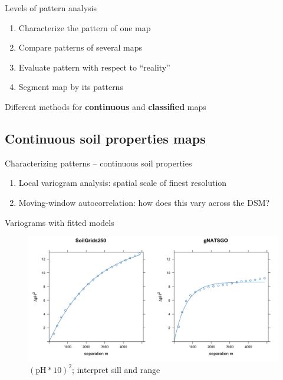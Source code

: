 \documentclass[aspectratio=169]{beamer}
\begin{document}
\begin{frame}{Levels of pattern analysis}
\begin{enumerate}
    \item Characterize the pattern of one map
    \item Compare patterns of several maps
    \item Evaluate pattern with respect to ``reality''
    \item Segment map by its patterns
\end{enumerate}
\vspace{2ex}
Different methods for \textbf{continuous} and \textbf{classified} maps
\end{frame}

\subsection{Continuous soil properties maps}

\begin{frame}{Characterizing patterns -- continuous soil properties}
    \begin{enumerate}
        \item Local variogram analysis: spatial scale of finest resolution
        \item Moving-window autocorrelation: how does this vary across the DSM?
    \end{enumerate}
\end{frame}

\begin{frame}{Variograms with fitted models}
    \begin{figure}
        \centering
        \includegraphics[height=0.6\textheight]{./graphics_david/variograms.png}
\\${(\mathrm{pH} * 10)}^2$; interpret sill and range
    \end{figure}
\end{frame}
\end{document}
